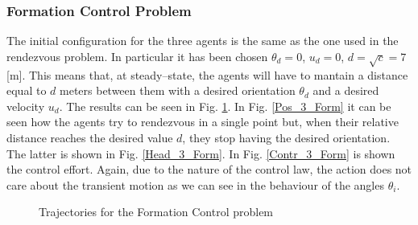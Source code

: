 \documentclass[11pt]{article}
\begin{document}
\subsubsection*{Formation Control Problem}

The initial configuration for the three agents is the same as the one used in the rendezvous problem. In particular it has been chosen $\theta_d = 0$, $u_d = 0$, $d = \sqrt{c} = 7$ [m]. This means that, at steady--state, the agents will have to mantain a distance equal to $d$ meters between them with a desired orientation $\theta_d$ and a desired velocity $u_d$. The results can be seen in Fig. \ref{fig: Traj_3_Form}. In Fig. \ref{Pos_3_Form} it can be seen how the agents try to rendezvous in a single point but, when their relative distance reaches the desired value $d$, they stop having the desired orientation. The latter is shown in Fig. \ref{Head_3_Form}. In Fig. \ref{Contr_3_Form} is shown the control effort. Again, due to the nature of the control law, the action does not care about the transient motion as we can see in the behaviour of the angles $\theta_i$.
\begin{figure}[H]
\centering
{} \quad
{} 
\caption{Trajectories for the Formation Control problem}
\label{fig: Traj_3_Form}
\end{figure}
\end{document}
